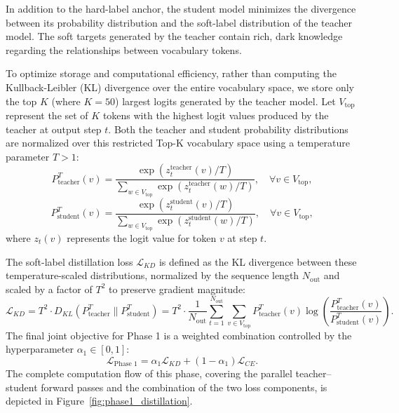 In addition to the hard-label anchor, the student model minimizes the divergence between its probability distribution and the soft-label distribution of the teacher model. The soft targets generated by the teacher contain rich, dark knowledge regarding the relationships between vocabulary tokens.

To optimize storage and computational efficiency, rather than computing the Kullback-Leibler (KL) divergence over the entire vocabulary space, we store only the top $K$ (where $K=50$) largest logits generated by the teacher model. Let $V_{\text{top}}$ represent the set of $K$ tokens with the highest logit values produced by the teacher at output step $t$. Both the teacher and student probability distributions are normalized over this restricted Top-K vocabulary space using a temperature parameter $T > 1$:
\begin{equation}
    P_{\text{teacher}}^T(v) = \frac{\exp(z_t^{\text{teacher}}(v) / T)}{\sum_{w \in V_{\text{top}}} \exp(z_t^{\text{teacher}}(w) / T)}, \quad \forall v \in V_{\text{top}},
\end{equation}
\begin{equation}
    P_{\text{student}}^T(v) = \frac{\exp(z_t^{\text{student}}(v) / T)}{\sum_{w \in V_{\text{top}}} \exp(z_t^{\text{student}}(w) / T)}, \quad \forall v \in V_{\text{top}},
\end{equation}
where $z_t(v)$ represents the logit value for token $v$ at step $t$.

The soft-label distillation loss $\mathcal{L}_{KD}$ is defined as the KL divergence between these temperature-scaled distributions, normalized by the sequence length $N_{\text{out}}$ and scaled by a factor of $T^2$ to preserve gradient magnitude:
\begin{equation}
    \mathcal{L}_{KD} = T^2 \cdot D_{KL}\left( P_{\text{teacher}}^T \parallel P_{\text{student}}^T \right) = T^2 \cdot \frac{1}{N_{\text{out}}} \sum_{t=1}^{N_{\text{out}}} \sum_{v \in V_{\text{top}}} P_{\text{teacher}}^T(v) \log \left( \frac{P_{\text{teacher}}^T(v)}{P_{\text{student}}^T(v)} \right).
\end{equation}
The final joint objective for Phase 1 is a weighted combination controlled by the hyperparameter $\alpha_1 \in [0, 1]$:
\begin{equation}
    \mathcal{L}_{\text{Phase 1}} = \alpha_1 \mathcal{L}_{KD} + (1 - \alpha_1) \mathcal{L}_{CE}.
\end{equation}
The complete computation flow of this phase, covering the parallel teacher--student forward passes and the combination of the two loss components, is depicted in Figure~\ref{fig:phase1_distillation}.

